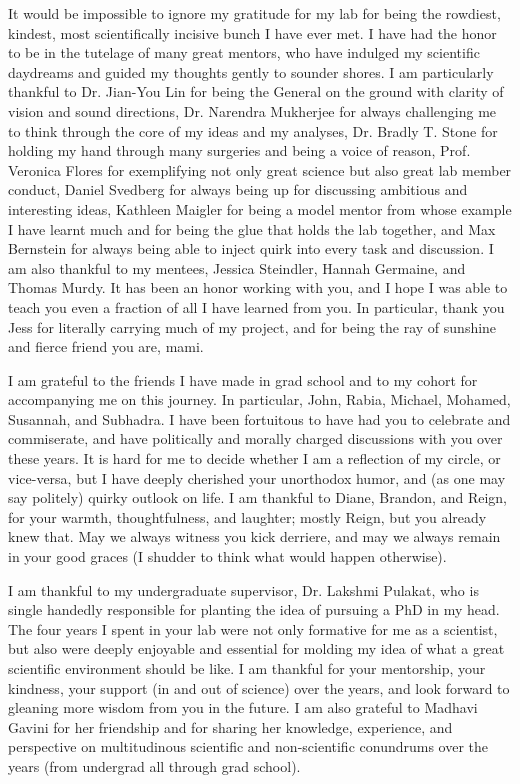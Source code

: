\documentclass{brandeis-dissertation3.12}
\begin{document}
\begin{dissertation-acknowledgements}
It would be impossible to ignore my gratitude for my lab for being the rowdiest, kindest, most scientifically incisive bunch I have ever met. I have had the honor to be in the tutelage of many great mentors, who have indulged my scientific daydreams and guided my thoughts gently to sounder shores. I am particularly thankful to Dr. Jian-You Lin for being the General on the ground with clarity of vision and sound directions, Dr. Narendra Mukherjee for always challenging me to think through the core of my ideas and my analyses, Dr. Bradly T. Stone for holding my hand through many surgeries and being a voice of reason, Prof. Veronica Flores for exemplifying not only great science but also great lab member conduct, Daniel Svedberg for always being up for discussing ambitious and interesting ideas, Kathleen Maigler for being a model mentor from whose example I have learnt much and for being the glue that holds the lab together, and Max Bernstein for always being able to inject quirk into every task and discussion. I am also thankful to my mentees, Jessica Steindler, Hannah Germaine, and Thomas Murdy. It has been an honor working with you, and I hope I was able to teach you even a fraction of all I have learned from you. In particular, thank you Jess for literally carrying much of my project, and for being the ray of sunshine and fierce friend you are, mami.

I am grateful to the friends I have made in grad school and to my cohort for accompanying me on this journey. In particular, John, Rabia, Michael, Mohamed, Susannah, and Subhadra. I have been fortuitous to have had you to celebrate and commiserate, and have politically and morally charged discussions with you over these years. It is hard for me to decide whether I am a reflection of my circle, or vice-versa, but I have deeply cherished your unorthodox humor, and (as one may say politely) quirky outlook on life. I am thankful to Diane, Brandon, and Reign, for your warmth, thoughtfulness, and laughter; mostly Reign, but you already knew that. May we always witness you kick derriere, and may we always remain in your good graces (I shudder to think what would happen otherwise).

I am thankful to my undergraduate supervisor, Dr. Lakshmi Pulakat, who is single handedly responsible for planting the idea of pursuing a PhD in my head. The four years I spent in your lab were not only formative for me as a scientist, but also were deeply enjoyable and essential for molding my idea of what a great scientific environment should be like. I am thankful for your mentorship, your kindness, your support (in and out of science) over the years, and look forward to gleaning more wisdom from you in the future. I am also grateful to Madhavi Gavini for her friendship and for sharing her knowledge, experience, and perspective on multitudinous scientific and non-scientific conundrums over the years (from undergrad all through grad school).


\end{dissertation-acknowledgements}
\end{document}
